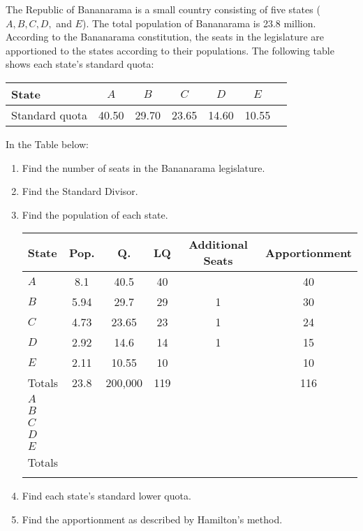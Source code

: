 	\clearpage
	\item The Republic of Bananarama is  a small country consisting of five states ($A, B, C, D,$ and $E$).  The total population of Bananarama is 23.8 million.  According to the Bananarama constitution, the seats in the legislature are apportioned to the states according to their populations.  The following table shows each state's standard quota:
	
	\begin{center}
	\begin{tabular}{lcccccc}
State & $A$ & $B$ & $C$ & $D$ & $E$ \\\hline
Standard quota &40.50 & 29.70 & 23.65 & 14.60 & 10.55 \\\hline
\end{tabular}
\end{center}
	
	In the Table below:
	\begin{enumerate}
	
	
	\item Find the number of seats in the Bananarama legislature.
	\item Find the Standard Divisor.
	\item Find the population of each state.

	\begin{center}
	\begin{tabular}{l|c|c|c|c|c} \hline
State	&	Pop. &Q. &	LQ&  Additional Seats	 	&  	 	Apportionment \\\hline
\ifsolns	$A$ &8.1&40.5&40&&40\\\hline
	$B$ &5.94&29.7&29&1&30\\\hline
	$C$ &4.73&23.65&23&1&24\\\hline
	$D$ &2.92&14.6&14&1&15\\\hline
	$E$ &2.11&10.55&10&&10\\\hline
	Totals &23.8&200,000&119&&116\\\hline
	\else
	$A$ &&&&&\\\hline
	$B$ &&&&&\\\hline
	$C$ &&&&&\\\hline
	$D$ &&&&&\\\hline
	$E$ &&&&&\\\hline
	Totals &&&&&\\\hline \fi
	\end{tabular}
	
	\end{center}

	\item Find each state's standard lower quota.
	\item Find the apportionment as described by Hamilton's method.
\end{enumerate}


